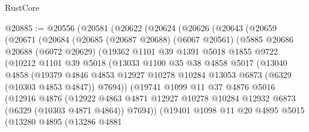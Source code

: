 \begin{lexlean}{RustCore}
\begin{coremodule}
@20885 := @20556
    (@20581
      (@20622
        (@20624
          (@20626
            (@20643
              (@20659
                (@20671
                  (@20684
                    (@20685
                      (@20687 @20688)
                      (@6067 @20561)
                      (@5885
                        @20686
                        @20688
                        (@6072 @20629)
                        (@19362
                          @1101
                          @39
                          @1391
                          @5018
                          @1855
                          @9722
                          (@10212
                            @1101
                            @39
                            @5018
                            (@13033
                              @1100
                              @35
                              @38
                              @4858
                              @5017
                              (@13040
                                @4858
                                (@19379
                                  @4846
                                  @4853
                                  @12927
                                  @10278
                                  @10284
                                  @13053
                                  @6873
                                  (@6329 (@10303 @4853 @4847))
                                  @7694))
                              (@19741
                                @1099
                                @11
                                @37
                                @4876
                                @5016
                                (@12916
                                  @4876
                                  (@12922
                                    @4863
                                    @4871
                                    @12927
                                    @10278
                                    @10284
                                    @12932
                                    @6873
                                    (@6329 (@10303 @4871 @4864))
                                    @7694))
                                (@19401
                                  @1098
                                  @11
                                  @20
                                  @4895
                                  @5015
                                  (@13280
                                    @4895
                                    (@13286
                                      @4881

\end{coremodule}
\end{lexlean}
